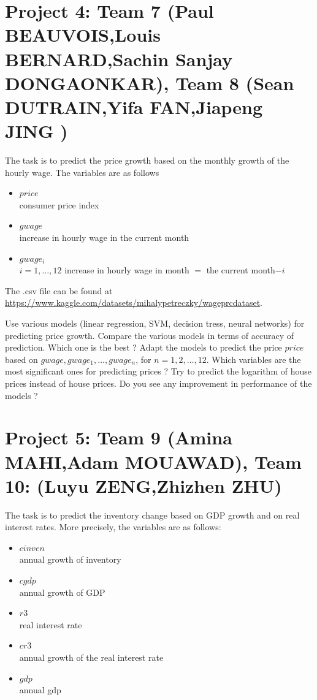 \documentclass{article}
\begin{document}
   



\section*{Project 4: Team 7 (Paul BEAUVOIS,Louis BERNARD,Sachin Sanjay DONGAONKAR), Team 8 (Sean DUTRAIN,Yifa FAN,Jiapeng JING ) }
  The task is to predict the price growth based on the monthly growth of the hourly wage. The variables are as follows
   \begin{itemize}
   \item{$price$ \\}                   consumer price index
   \item{$gwage$ \\}                    increase in hourly wage in the current month
   \item{$gwage_i$ \\} $i=1,\ldots,12$   increase in hourly wage in month $=$ the current month$- i$
  \end{itemize}

   The .csv file can be found at \url{https://www.kaggle.com/datasets/mihalypetreczky/wageprcdataset}. 


    Use various models (linear regression, SVM, decision tress, neural networks) for predicting price growth. Compare the various models in terms of accuracy of prediction. Which one is the best ? 
     Adapt the models to predict the price $price$ based on $gwage,gwage_1,\ldots,gwage_n$, for $n=1,2,\ldots,12$. Which variables are the most
 significant ones for predicting  prices  ?  Try to predict the logarithm of house prices instead of house prices. Do you see any improvement in performance of the models ?

   

 
\section*{Project 5: Team 9 (Amina MAHI,Adam MOUAWAD), Team 10: (Luyu ZENG,Zhizhen ZHU) }
  The task is to predict the inventory change based on GDP growth and on real interest rates. More precisely, the variables are as follows:
  \begin{itemize}
  \item{$cinven$\\}  annual growth of inventory
  \item{$cgdp$\\}    annual growth of GDP %
  \item{$r3$\\}      real interest rate      
  \item{$cr3$\\}     annual growth of the real interest rate      
  \item{$gdp$\\}     annual gdp      
 \end{itemize}
\end{document}

